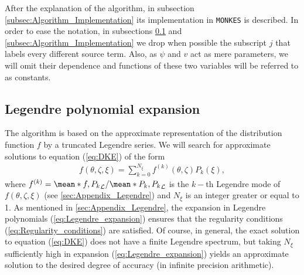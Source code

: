 \documentclass[10pt]{iopart}
\newcommand{\Lorentz}{\mathcal{L}}
\newcommand{\MONKES}{{\texttt{MONKES}}}
\begin{document}
After the explanation of the algorithm, in subsection \ref{subsec:Algorithm_Implementation} its implementation in {\MONKES} is described. In order to ease the notation, in subsections \ref{subsec:Legendre_expansion} and \ref{subsec:Algorithm_Implementation} we drop when possible the subscript $j$ that labels every different source term.  Also, as $\psi$ and $v$ act as mere parameters, we will omit their dependence and functions of these two variables will be referred to as constants. 

\subsection{Legendre polynomial expansion}\label{subsec:Legendre_expansion}
The algorithm is based on the approximate representation of the distribution function $f$ by a truncated Legendre series. We will search for approximate solutions to equation (\ref{eq:DKE}) of the form
%
\begin{align}
	f(\theta,\zeta,\xi) = \sum_{k=0}^{N_\xi} f^{(k)}(\theta,\zeta) P_k(\xi), \label{eq:Legendre_expansion}
\end{align} 
where $f^{(k)} = \mean*{f,P_k}_\Lorentz / \mean*{P_k,P_k}_\Lorentz$ is the $k-$th Legendre mode of $f(\theta,\zeta,\xi)$ (see \ref{sec:Appendix_Legendre}) and $N_\xi$ is an integer greater or equal to 1. As mentioned in \ref{sec:Appendix_Legendre}, the expansion in Legendre polynomials (\ref{eq:Legendre_expansion}) ensures that the regularity conditions (\ref{eq:Regularity_conditions}) are satisfied. Of course, in general, the exact solution to equation (\ref{eq:DKE}) does not have a finite Legendre spectrum, but taking $N_\xi$ sufficiently high in expansion (\ref{eq:Legendre_expansion}) yields an approximate solution to the desired degree of accuracy (in infinite precision arithmetic).  
\end{document}
